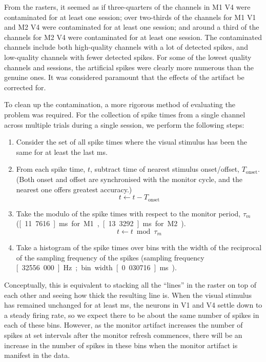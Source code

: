 From the rasters, it seemed as if three-quarters of the channels in \ac{M1} \ac{V4} were contaminated for at least one session; over two-thirds of the channels for \ac{M1} \ac{V1} and \ac{M2} \ac{V4} were contaminated for at least one session; and around a third of the channels for \ac{M2} \ac{V4} were contaminated for at least one session.
The contaminated channels include both high-quality channels with a lot of detected spikes, and low-quality channels with fewer detected spikes.
For some of the lowest quality channels and sessions, the artificial spikes were clearly more numerous than the genuine ones.
It was considered paramount that the effects of the artifact be corrected for.

To clean up the contamination, a more rigorous method of evaluating the problem was required.
For the collection of spike times from a single channel across multiple trials during a single session, we perform the following steps:
\begin{enumerate}
\item Consider the set of all spike times where the visual stimulus has been the same for at least the last \unit[150]{ms}.
\item From each spike time, $t$, subtract time of nearest stimulus onset/offset, $T_{\text{onset}}$.
      (Both onset and offset are synchronised with the monitor cycle, and the nearest one offers greatest accuracy.)
$$
t \leftarrow t - T_{\text{onset}}
$$
\item Take the modulo of the spike times with respect to the monitor period, $\tau_m$ (\unit[11.7616]{ms} for \ac{M1}, \unit[13.3292]{ms} for \ac{M2}).
$$
t \leftarrow t \bmod \tau_m
$$
\item Take a histogram of the spike times over bins with the width of the reciprocal of the sampling frequency of the spikes (sampling frequency \unit[32556.000]{Hz}; bin width \unit[0.030716]{ms}).
\end{enumerate}
Conceptually, this is equivalent to stacking all the ``lines'' in the raster on top of each other and seeing how thick the resulting line is.
When the visual stimulus has remained unchanged for at least \unit[150]{ms}, the neurons in \ac{V1} and \ac{V4} settle down to a steady firing rate, so we expect there to be about the same number of spikes in each of these bins.
However, as the monitor artifact increases the number of spikes at set intervals after the monitor refresh commences, there will be an increase in the number of spikes in these bins when the monitor artifact is manifest in the data.

